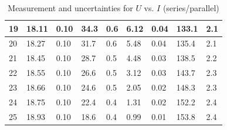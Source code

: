 \documentclass[12pt, a4paper]{article}
\begin{document}
\begin{table}[H]
\begin{center}
\begin{tabular}{|l|llll|llll|}
	19 & \multicolumn{1}{l|}{18.11}  & \multicolumn{1}{l|}{0.10}     & \multicolumn{1}{l|}{34.3}    & 0.6       & \multicolumn{1}{l|}{6.12}   & \multicolumn{1}{l|}{0.04}     & \multicolumn{1}{l|}{133.1}   & 2.1       \\ \hline
	20 & \multicolumn{1}{l|}{18.27}  & \multicolumn{1}{l|}{0.10}     & \multicolumn{1}{l|}{31.7}    & 0.6       & \multicolumn{1}{l|}{5.48}   & \multicolumn{1}{l|}{0.04}     & \multicolumn{1}{l|}{135.4}   & 2.1       \\ \hline
	21 & \multicolumn{1}{l|}{18.45}  & \multicolumn{1}{l|}{0.10}     & \multicolumn{1}{l|}{28.7}    & 0.5       & \multicolumn{1}{l|}{4.48}   & \multicolumn{1}{l|}{0.03}     & \multicolumn{1}{l|}{138.5}   & 2.2       \\ \hline
	22 & \multicolumn{1}{l|}{18.55}  & \multicolumn{1}{l|}{0.10}     & \multicolumn{1}{l|}{26.6}    & 0.5       & \multicolumn{1}{l|}{3.12}   & \multicolumn{1}{l|}{0.03}     & \multicolumn{1}{l|}{143.7}   & 2.3       \\ \hline
	23 & \multicolumn{1}{l|}{18.66}  & \multicolumn{1}{l|}{0.10}     & \multicolumn{1}{l|}{24.6}    & 0.5       & \multicolumn{1}{l|}{2.05}   & \multicolumn{1}{l|}{0.02}     & \multicolumn{1}{l|}{148.3}   & 2.3       \\ \hline
	24 & \multicolumn{1}{l|}{18.75}  & \multicolumn{1}{l|}{0.10}     & \multicolumn{1}{l|}{22.4}    & 0.4       & \multicolumn{1}{l|}{1.31}   & \multicolumn{1}{l|}{0.02}     & \multicolumn{1}{l|}{152.2}   & 2.4       \\ \hline
	25 & \multicolumn{1}{l|}{18.93}  & \multicolumn{1}{l|}{0.10}     & \multicolumn{1}{l|}{18.6}    & 0.4       & \multicolumn{1}{l|}{0.99}   & \multicolumn{1}{l|}{0.01}     & \multicolumn{1}{l|}{153.8}   & 2.4       \\ \hline
	\end{tabular}
	\caption{Measurement and uncertainties for $U$ vs. $I$ (series/parallel)}		
	\end{center}
\end{table}
\end{document}
